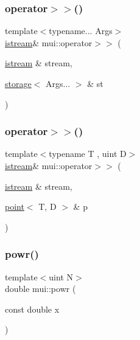 \mbox{\label{namespacemui_a4789207f36735ea6248dfc01a4e326b1}} 
\subsubsection{\texorpdfstring{operator$>$$>$()}{operator>>()}\hspace{0.1cm}{\footnotesize\ttfamily [19/20]}}
{\footnotesize\ttfamily template$<$typename... Args$>$ \\
\hyperlink{classmui_1_1istream}{istream}\& mui\+::operator$>$$>$ (\begin{DoxyParamCaption}\item[{\hyperlink{classmui_1_1istream}{istream} \&}]{stream,  }\item[{\hyperlink{structmui_1_1storage}{storage}$<$ Args... $>$ \&}]{st }\end{DoxyParamCaption})}

\mbox{\label{namespacemui_abcee4d382903f03011151ffca9acd369}} 
\subsubsection{\texorpdfstring{operator$>$$>$()}{operator>>()}\hspace{0.1cm}{\footnotesize\ttfamily [20/20]}}
{\footnotesize\ttfamily template$<$typename T , uint D$>$ \\
\hyperlink{classmui_1_1istream}{istream}\& mui\+::operator$>$$>$ (\begin{DoxyParamCaption}\item[{\hyperlink{classmui_1_1istream}{istream} \&}]{stream,  }\item[{\hyperlink{structmui_1_1point}{point}$<$ T, D $>$ \&}]{p }\end{DoxyParamCaption})}

\mbox{\label{namespacemui_ab915ac09900cc1e6986f3f054363016c}} 
\subsubsection{\texorpdfstring{powr()}{powr()}}
{\footnotesize\ttfamily template$<$uint N$>$ \\
double mui\+::powr (\begin{DoxyParamCaption}\item[{const double}]{x }\end{DoxyParamCaption})\hspace{0.3cm}{\ttfamily [inline]}}

